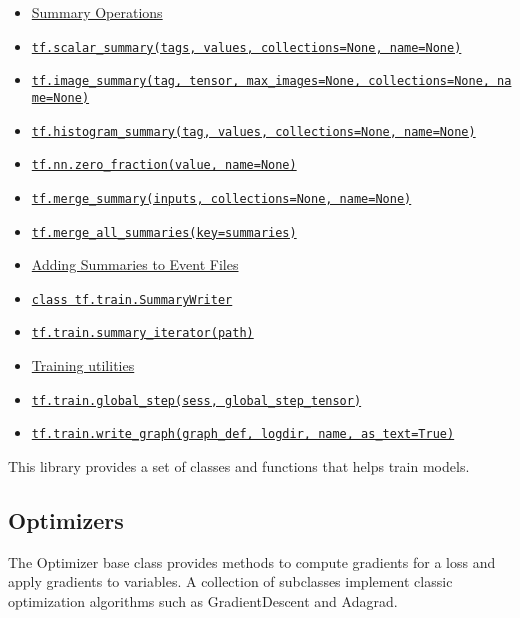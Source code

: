 \begin{itemize}
\item
  \protect\hyperlink{AUTOGENERATED-summary-operations}{Summary
  Operations}
\item
  \protect\hyperlink{scalarux5fsummary}{\texttt{tf.scalar\_summary(tags,\ values,\ collections=None,\ name=None)}}
\item
  \protect\hyperlink{imageux5fsummary}{\texttt{tf.image\_summary(tag,\ tensor,\ max\_images=None,\ collections=None,\ name=None)}}
\item
  \protect\hyperlink{histogramux5fsummary}{\texttt{tf.histogram\_summary(tag,\ values,\ collections=None,\ name=None)}}
\item
  \protect\hyperlink{zeroux5ffraction}{\texttt{tf.nn.zero\_fraction(value,\ name=None)}}
\item
  \protect\hyperlink{mergeux5fsummary}{\texttt{tf.merge\_summary(inputs,\ collections=None,\ name=None)}}
\item
  \protect\hyperlink{mergeux5fallux5fsummaries}{\texttt{tf.merge\_all\_summaries(key=\textquotesingle{}summaries\textquotesingle{})}}
\item
  \protect\hyperlink{AUTOGENERATED-adding-summaries-to-event-files}{Adding
  Summaries to Event Files}
\item
  \protect\hyperlink{SummaryWriter}{\texttt{class\ tf.train.SummaryWriter}}
\item
  \protect\hyperlink{summaryux5fiterator}{\texttt{tf.train.summary\_iterator(path)}}
\item
  \protect\hyperlink{AUTOGENERATED-training-utilities}{Training
  utilities}
\item
  \protect\hyperlink{globalux5fstep}{\texttt{tf.train.global\_step(sess,\ global\_step\_tensor)}}
\item
  \protect\hyperlink{writeux5fgraph}{\texttt{tf.train.write\_graph(graph\_def,\ logdir,\ name,\ as\_text=True)}}
\end{itemize}

This library provides a set of classes and functions that helps train
models.

\subsection{Optimizers }\label{optimizers}

The Optimizer base class provides methods to compute gradients for a
loss and apply gradients to variables. A collection of subclasses
implement classic optimization algorithms such as GradientDescent and
Adagrad.

